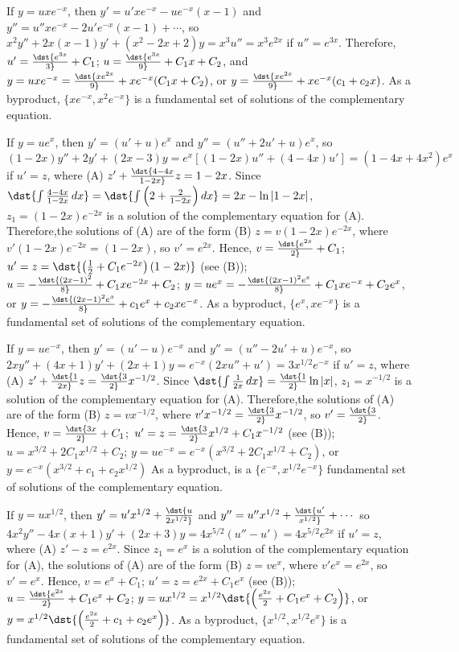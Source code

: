 \documentclass[dvips]{book}
\renewcommand{\exer}[1]{\par\medskip\;\noindent{\color{red}\bf #1.}}
\numberwithin{example}{section}
\numberwithin{equation}{section}
\numberwithin{theorem}{section}
\numberwithin{table}{section}
\numberwithin{figure}{section}
\begin{document}
\exer{5.6.10}
If $y=uxe^{-x}$, then $y'=u'xe^{-x}-ue^{-x}(x-1)$ and
$y''=u''xe^{-x}-2u'e^{-x}(x-1)+\cdots$, so
$x^2y''+2x(x-1)y'+(x^2-2x+2)y=x^3u''=x^3e^{2x}$ if $u''=e^{3x}$.
Therefore,$u'=\dst{e^{3x}\over3}+C_1$;\;
$u=\dst{e^{3x}\over9}+C_1x+C_2$, and
$y=uxe^{-x}=\dst{xe^{2x}\over9}+xe^{-x}(C_1x+C_2)$, or
$y=\dst{xe^{2x}\over9}+xe^{-x}(c_1+c_2x)$. As a byproduct,
$\{xe^{-x},x^2e^{-x}\}$ is a fundamental set of solutions of the
complementary equation.


\exer{5.6.12}
If $y=ue^x$, then $y'=(u'+u)e^x$ and $y''=(u''+2u'+u)e^x$, so
$(1-2x)y''+2y'+(2x-3)y=e^x\left[(1-2x)u''+(4-4x)u'\right]=(1-4x+4x^2)e^x$
if $u'=z$, where (A) $z'+\dst{4-4x\over1-2x}z=1-2x$. Since
$\dst{\int{4-4x\over1-2x}\,dx}=
\dst{\int{\left(2+{2\over1-2x}\right)}\,dx}=2x-\ln|1-2x|$,
$z_1=(1-2x)e^{-2x}$ is a solution of the complementary equation for
(A). Therefore,the solutions of (A) are of the form (B)
$z=v(1-2x)e^{-2x}$, where $v'(1-2x)e^{-2x}=(1-2x)$, so $v'=e^{2x}$.
Hence, $v=\dst{e^{2x}\over2}+C_1$;\;
$u'=z=\dst{\left({1\over2}+C_1e^{-2x}\right)(1-2x)}$ (see (B));\;
$u=-\dst{(2x-1)^2\over8}+C_1xe^{-2x}+C_2$;\;
$y=ue^x=-\dst{(2x-1)^2e^x\over8}+C_1xe^{-x}+C_2e^x$, or
$y=-\dst{(2x-1)^2e^x\over8}+c_1e^x+c_2xe^{-x}$. As a byproduct,
$\{e^x,xe^{-x}\}$ is a fundamental set of solutions of the
complementary equation.


\exer{5.6.14}
If $y=ue^{-x}$, then $y'=(u'-u)e^{-x}$ and $y''=(u''-2u'+u)e^{-x}$, so
$2xy''+(4x+1)y'+(2x+1)y=e^{-x}(2xu''+u')=3x^{1/2}e^{-x}$ if $u'=z$,
where (A) $z'+\dst{1\over2x}z=\dst{3\over2}x^{-1/2}$. Since $\dst{\int
{1\over2x}\,dx}=\dst{1\over2}\ln|x|$, $z_1=x^{-1/2}$ is a solution of
the complementary equation for (A). Therefore,the solutions of (A) are
of the form (B) $z=vx^{-1/2}$, where
$v'x^{-1/2}=\dst{3\over2}x^{-1/2}$, so $v'=\dst{3\over2}$. Hence,
$v=\dst{3x\over2}+C_1$;\ $u'=z=\dst{3\over2}x^{1/2}+C_1x^{-1/2}$ (see
(B));\ $u=x^{3/2}+2C_1x^{1/2}+C_2$;\;
$y=ue^{-x}=e^{-x}(x^{3/2}+2C_1x^{1/2}+C_2)$, or
$y=e^{-x}(x^{3/2}+c_1+c_2x^{1/2})$ As a byproduct, is a
$\{e^{-x},x^{1/2}e^{-x}\}$ fundamental set of solutions of the
complementary equation.


\exer{5.6.16}
If $y=ux^{1/2}$, then $y'=u'x^{1/2}+\dst{u\over2x^{1/2}}$ and
$y''=u''x^{1/2}+\dst{u'\over x^{1/2}}+\cdots$ so
$4x^2y''-4x(x+1)y'+(2x+3)y=4x^{5/2}(u''-u')=4x^{5/2}e^{2x}$ if $u'=z$,
where (A) $z'-z=e^{2x}$. Since $z_1=e^x$ is a solution of the
complementary equation for (A), the solutions of (A) are of the form
(B) $z=ve^x$, where $v'e^x=e^{2x}$, so $v'=e^x$. Hence, $v=e^x+C_1$;\;
$u'=z=e^{2x}+C_1e^x$ (see (B));\ $u=\dst{e^{2x}\over2}+C_1e^x+C_2$;\;
$y=ux^{1/2}=x^{1/2}\dst{\left({e^{2x}\over2}+C_1e^x+C_2\right)}$, or
$y=x^{1/2}\dst{\left({e^{2x}\over2}+c_1+c_2e^x\right)}$. As a
byproduct, $\{x^{1/2},x^{1/2}e^x\}$ is a fundamental set of solutions
of the complementary equation.
\end{document}
